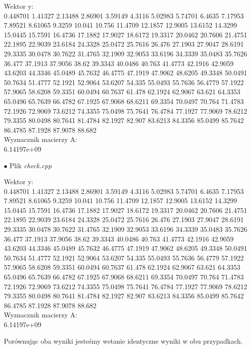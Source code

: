 \documentclass{article}
\begin{document}
    \begin{center}
      \begin{tcolorbox}
        Wektor y:\\
        0.448701 1.41327 2.13488 2.86901 3.59149 4.3116 5.02983 5.74701 6.4635 7.17953 7.89521 8.61065 9.3259 10.041 10.756 11.4709 12.1857 12.9005 13.6152 14.3299 15.0445 15.7591 16.4736 17.1882 17.9027 18.6172 19.3317 20.0462 20.7606 21.4751 22.1895 22.9039 23.6184 24.3328 25.0472 25.7616 26.476 27.1903 27.9047 28.6191 29.3335 30.0478 30.7622 31.4765 32.1909 32.9053 33.6196 34.3339 35.0483 35.7626 36.477 37.1913 37.9056 38.62 39.3343 40.0486 40.763 41.4773 42.1916 42.9059 43.6203 44.3346 45.0489 45.7632 46.4775 47.1919 47.9062 48.6205 49.3348 50.0491 50.7634 51.4777 52.1921 52.9064 53.6207 54.335 55.0493 55.7636 56.4779 57.1922 57.9065 58.6208 59.3351 60.0494 60.7637 61.478 62.1924 62.9067 63.621 64.3353 65.0496 65.7639 66.4782 67.1925 67.9068 68.6211 69.3354 70.0497 70.764 71.4783 72.1926 72.9069 73.6212 74.3355 75.0498 75.7641 76.4784 77.1927 77.9069 78.6212 79.3355 80.0498 80.7641 81.4784 82.1927 82.907 83.6213 84.3356 85.0499 85.7642 86.4785 87.1928 87.9078 88.682 
        \\
        Wyznacznik macierzy A:\\
        6.14197e+09
      \end{tcolorbox}

      \begin{flushleft}
        $\bullet$ Plik \textit{check.cpp}
      \end{flushleft}

      \begin{tcolorbox}
        Wektor y:\\
        0.448701 1.41327 2.13488 2.86901 3.59149 4.3116 5.02983 5.74701 6.4635 7.17953 7.89521 8.61065 9.3259 10.041 10.756 11.4709 12.1857 12.9005 13.6152 14.3299 15.0445 15.7591 16.4736 17.1882 17.9027 18.6172 19.3317 20.0462 20.7606 21.4751 22.1895 22.9039 23.6184 24.3328 25.0472 25.7616 26.476 27.1903 27.9047 28.6191 29.3335 30.0478 30.7622 31.4765 32.1909 32.9053 33.6196 34.3339 35.0483 35.7626 36.477 37.1913 37.9056 38.62 39.3343 40.0486 40.763 41.4773 42.1916 42.9059 43.6203 44.3346 45.0489 45.7632 46.4775 47.1919 47.9062 48.6205 49.3348 50.0491 50.7634 51.4777 52.1921 52.9064 53.6207 54.335 55.0493 55.7636 56.4779 57.1922 57.9065 58.6208 59.3351 60.0494 60.7637 61.478 62.1924 62.9067 63.621 64.3353 65.0496 65.7639 66.4782 67.1925 67.9068 68.6211 69.3354 70.0497 70.764 71.4783 72.1926 72.9069 73.6212 74.3355 75.0498 75.7641 76.4784 77.1927 77.9069 78.6212 79.3355 80.0498 80.7641 81.4784 82.1927 82.907 83.6213 84.3356 85.0499 85.7642 86.4785 87.1928 87.9078 88.682 
        \\
        Wyznacznik macierzy A:\\
        6.14197e+09  
      \end{tcolorbox}
    \end{center}
    Porównując oba wyniki jesteśmy wstanie identyczne wyniki w obu przypadkach.\\
\end{document}
